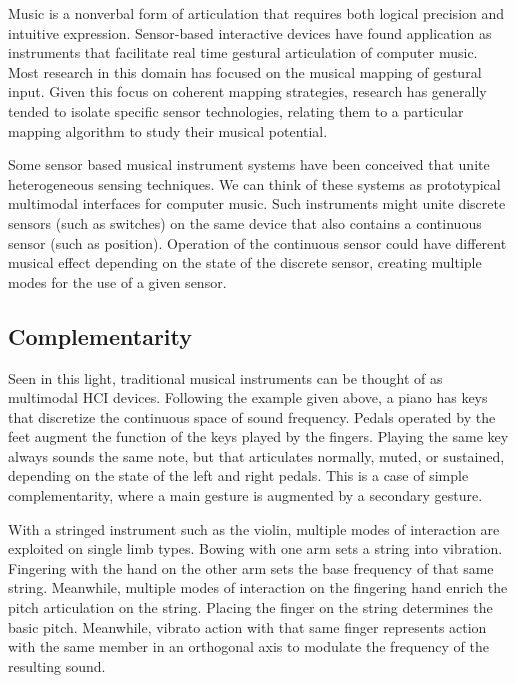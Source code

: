 Music is a nonverbal form of articulation that requires both logical precision and intuitive expression. Sensor-based interactive devices have found application as instruments that facilitate real time gestural articulation of computer music. Most research in this domain \cite{:2000c} has focused on the musical mapping of gestural input. Given this focus on coherent mapping strategies, research has generally tended to isolate specific sensor technologies, relating them to a particular mapping algorithm to study their musical potential. 

Some sensor based musical instrument systems have been conceived \cite{Waisvisz:1985} that unite heterogeneous sensing techniques. We can think of these systems as prototypical multimodal interfaces for computer music. Such instruments might unite discrete sensors (such as switches) on the same device that also contains a continuous sensor (such as position). Operation of the continuous sensor could have different musical effect depending on the state of the discrete sensor, creating multiple modes for the use of a given sensor.


\subsection{Complementarity}


Seen in this light, traditional musical instruments can be thought of as multimodal HCI devices. Following the example given above, a piano has keys that discretize the continuous space of sound frequency. Pedals operated by the feet augment the function of the keys played by the fingers. Playing the same key always sounds the same note, but that articulates normally, muted, or sustained, depending on the state of the left and right pedals. This is a case of simple complementarity, where a main gesture is augmented by a secondary gesture.

With a stringed instrument such as the violin, multiple modes of interaction are exploited on single limb types. Bowing with one arm sets a string into vibration. Fingering with the hand on the other arm sets the base frequency of that same string. Meanwhile, multiple modes of interaction on the fingering hand enrich the pitch articulation on the string. Placing the finger on the string determines the basic pitch. Meanwhile, vibrato action with that same finger represents action with the same member in an orthogonal axis to modulate the frequency of the resulting sound. 

